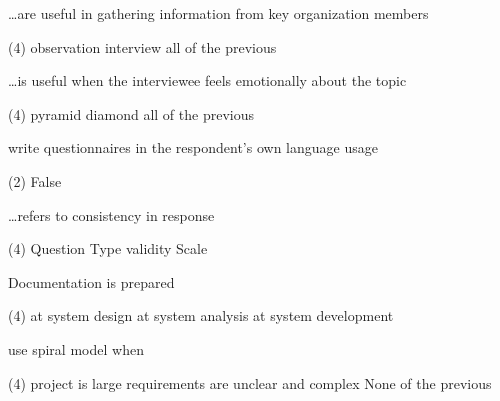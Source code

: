 \documentclass[10pt]{article}
\begin{document}
\begin{questions}
\begin{exercise}
    \end{exercise}
    \begin{exercise}
        \dots are useful in gathering information from key organization members
        \begin{choice}(4)
            \choice {}
            \choice observation
            \choice interview
            \choice all of the previous
        \end{choice}
    \end{exercise}
    \begin{exercise}
        \dots is useful when the interviewee feels emotionally about the topic
        \begin{choice}(4)
            \choice pyramid
            \choice {}
            \choice diamond
            \choice all of the previous
        \end{choice}
    \end{exercise}
    \begin{exercise}
        write questionnaires in the respondent's own language usage
        \begin{choice}(2)
            \choice {}
            \choice False
        \end{choice}
    \end{exercise}
    \begin{exercise}
        \dots refers to consistency in response
        \begin{choice}(4)
            \choice Question Type
            \choice {}
            \choice validity
            \choice Scale
        \end{choice}
    \end{exercise}
    \newpage
    \begin{exercise}
        Documentation is prepared
        \begin{choice}(4)
            \choice {}
            \choice at system design
            \choice at system analysis
            \choice at system development
        \end{choice}
    \end{exercise}
    \begin{exercise}
        use spiral model when
        \begin{choice}(4)
            \choice project is large
            \choice requirements are unclear and complex
            \choice {}
            \choice None of the previous
        \end{choice}

\end{exercise}
\end{questions}
\end{document}
